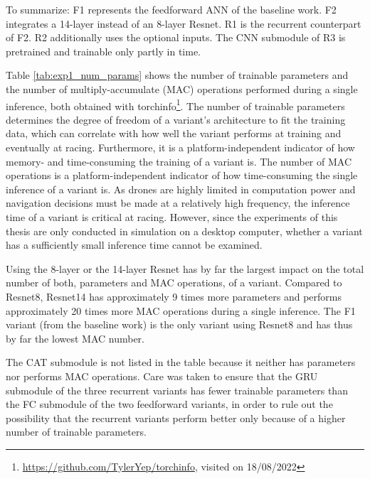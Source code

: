 To summarize: F1 represents the feedforward ANN of the baseline work.
F2 integrates a 14-layer instead of an 8-layer Resnet.
R1 is the recurrent counterpart of F2.
R2 additionally uses the optional inputs.
The CNN submodule of R3 is pretrained  
and trainable only partly in time.

Table \ref{tab:exp1_num_params} shows
the number of trainable parameters and 
the number of multiply-accumulate (MAC) operations 
performed during a single inference,
both obtained with 
torchinfo\footnote{\url{https://github.com/TylerYep/torchinfo}, visited on 18/08/2022}.
The number of trainable parameters 
determines the degree of freedom 
of a variant's architecture to fit the training data, 
which can correlate with 
how well the variant performs at training
and eventually at racing. 
Furthermore, it is a platform-independent indicator 
of how memory- and time-consuming the training of a variant is.
The number of MAC operations is a platform-independent indicator
of how time-consuming the single inference of a variant is.
As drones are highly limited in computation power and
navigation decisions must be made at a relatively high frequency,
the inference time of a variant is critical at racing.
However, since the experiments of this thesis are only conducted
in simulation on a desktop computer,
whether a variant has a sufficiently small inference time
cannot be examined.

Using the 8-layer or the 14-layer Resnet
has by far the largest impact on the 
total number of both, parameters and MAC operations, of a variant.
Compared to Resnet8, 
Resnet14 has approximately 
9 times more parameters and 
performs approximately 20 times more MAC operations
during a single inference.
The F1 variant (from the baseline work) 
is the only variant using Resnet8
and has thus by far the lowest MAC number.


The CAT submodule is not listed in the table because
it neither has parameters nor performs MAC operations.
Care was taken to ensure that the GRU submodule 
of the three recurrent variants has fewer trainable parameters
than the FC submodule of the two feedforward variants,
in order to rule out the possibility 
that the recurrent variants perform better only 
because of a higher number of trainable parameters.











